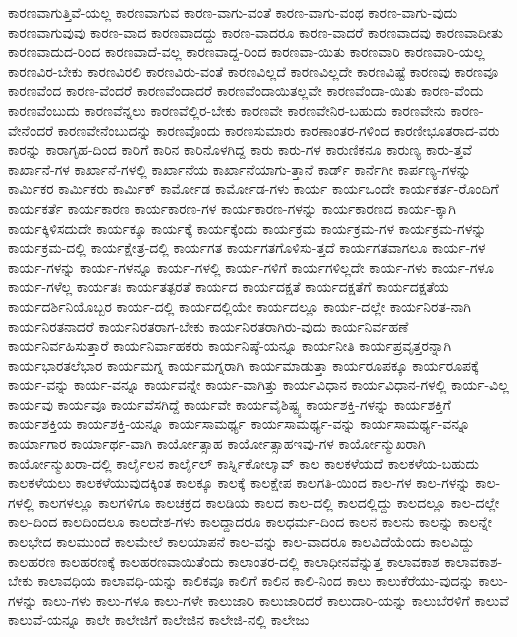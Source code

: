 {ಕಾರಣವಾಗುತ್ತಿವೆ-ಯಲ್ಲ
ಕಾರಣವಾಗುವ
ಕಾರಣ-ವಾಗು-ವಂತೆ
ಕಾರಣ-ವಾಗು-ವಂಥ
ಕಾರಣ-ವಾಗು-ವುದು
ಕಾರಣವಾಗುವುವು
ಕಾರಣ-ವಾದ
ಕಾರಣವಾದದ್ದು
ಕಾರಣ-ವಾದರೂ
ಕಾರಣ-ವಾದರೆ
ಕಾರಣವಾದವು
ಕಾರಣವಾದೀತು
ಕಾರಣವಾದುದ-ರಿಂದ
ಕಾರಣವಾದೆ-ವಲ್ಲ
ಕಾರಣವಾದ್ದ-ರಿಂದ
ಕಾರಣವಾ-ಯಿತು
ಕಾರಣವಾರಿ
ಕಾರಣವಾರಿ-ಯಲ್ಲ
ಕಾರಣವಿರ-ಬೇಕು
ಕಾರಣವಿರಲಿ
ಕಾರಣವಿರು-ವಂತೆ
ಕಾರಣವಿಲ್ಲದೆ
ಕಾರಣವಿಲ್ಲದೇ
ಕಾರಣವಿಷ್ಟೆ
ಕಾರಣವು
ಕಾರಣವೂ
ಕಾರಣವೆಂದ
ಕಾರಣ-ವೆಂದರೆ
ಕಾರಣವೆಂದಾದರೆ
ಕಾರಣವೆಂದಾಯಿತಲ್ಲವೇ
ಕಾರಣವೆಂದಾ-ಯಿತು
ಕಾರಣ-ವೆಂದು
ಕಾರಣವೆಂಬುದು
ಕಾರಣವೆನ್ನಲು
ಕಾರಣವೆಲ್ಲಿರ-ಬೇಕು
ಕಾರಣವೇ
ಕಾರಣವೇನಿರ-ಬಹುದು
ಕಾರಣವೇನು
ಕಾರಣ-ವೇನೆಂದರೆ
ಕಾರಣವೇನೆಂಬುದನ್ನು
ಕಾರಣವೊಂದು
ಕಾರಣಸುಮಾರು
ಕಾರಣಾಂತರ-ಗಳಿಂದ
ಕಾರಣೀಭೂತರಾದ-ವರು
ಕಾರನ್ನು
ಕಾರಾಗೃಹ-ದಿಂದ
ಕಾರಿಗೆ
ಕಾರಿನ
ಕಾರಿನೊಳಗಿದ್ದ
ಕಾರು
ಕಾರು-ಗಳ
ಕಾರುಣಿಕನೂ
ಕಾರುಣ್ಯ
ಕಾರು-ತ್ತವೆ
ಕಾರ್ಖಾನೆ-ಗಳ
ಕಾರ್ಖಾನೆ-ಗಳಲ್ಲಿ
ಕಾರ್ಖಾನೆಯ
ಕಾರ್ಖಾನೆಯಾಗು-ತ್ತಾನೆ
ಕಾರ್ಡ್
ಕಾರ್ನೆಗೀ
ಕಾರ್ಪಣ್ಯ-ಗಳನ್ನು
ಕಾರ್ಮಿಕರ
ಕಾರ್ಮಿಕರು
ಕಾರ್ಮಿಕ್
ಕಾರ್ಮೋಡ
ಕಾರ್ಮೋಡ-ಗಳು
ಕಾರ್ಯ
ಕಾರ್ಯಒಂದೇ
ಕಾರ್ಯಕರ್ತ-ರೊಂದಿಗೆ
ಕಾರ್ಯಕರ್ತೆ
ಕಾರ್ಯಕಾರಣ
ಕಾರ್ಯಕಾರಣ-ಗಳ
ಕಾರ್ಯಕಾರಣ-ಗಳನ್ನು
ಕಾರ್ಯಕಾರಣದ
ಕಾರ್ಯ-ಕ್ಕಾಗಿ
ಕಾರ್ಯಕ್ಕಿಳಿಸದುದೇ
ಕಾರ್ಯಕ್ಕೂ
ಕಾರ್ಯಕ್ಕೆ
ಕಾರ್ಯಕ್ಕೆಂದು
ಕಾರ್ಯಕ್ರಮ
ಕಾರ್ಯಕ್ರಮ-ಗಳ
ಕಾರ್ಯಕ್ರಮ-ಗಳನ್ನು
ಕಾರ್ಯಕ್ರಮ-ದಲ್ಲಿ
ಕಾರ್ಯಕ್ಷೇತ್ರ-ದಲ್ಲಿ
ಕಾರ್ಯಗತ
ಕಾರ್ಯಗತಗೊಳಿಸು-ತ್ತದೆ
ಕಾರ್ಯಗತವಾಗಲೂ
ಕಾರ್ಯ-ಗಳ
ಕಾರ್ಯ-ಗಳನ್ನು
ಕಾರ್ಯ-ಗಳನ್ನೂ
ಕಾರ್ಯ-ಗಳಲ್ಲಿ
ಕಾರ್ಯ-ಗಳಿಗೆ
ಕಾರ್ಯಗಳಿಲ್ಲದೇ
ಕಾರ್ಯ-ಗಳು
ಕಾರ್ಯ-ಗಳೂ
ಕಾರ್ಯ-ಗಳೆಲ್ಲ
ಕಾರ್ಯತಃ
ಕಾರ್ಯತತ್ಪರತೆ
ಕಾರ್ಯದ
ಕಾರ್ಯದಕ್ಷತೆ
ಕಾರ್ಯದಕ್ಷತೆಗೆ
ಕಾರ್ಯದಕ್ಷತೆಯ
ಕಾರ್ಯದರ್ಶಿನಿಯೊಬ್ಬರ
ಕಾರ್ಯ-ದಲ್ಲಿ
ಕಾರ್ಯದಲ್ಲಿಯೇ
ಕಾರ್ಯದಲ್ಲೂ
ಕಾರ್ಯ-ದಲ್ಲೇ
ಕಾರ್ಯನಿರತ-ನಾಗಿ
ಕಾರ್ಯನಿರತನಾದರೆ
ಕಾರ್ಯನಿರತರಾಗ-ಬೇಕು
ಕಾರ್ಯನಿರತರಾಗಿರು-ವುದು
ಕಾರ್ಯನಿರ್ವಹಣೆ
ಕಾರ್ಯನಿರ್ವಹಿಸುತ್ತಾರೆ
ಕಾರ್ಯನಿರ್ವಾಹಕರು
ಕಾರ್ಯನಿಷ್ಠೆ-ಯನ್ನೂ
ಕಾರ್ಯನೀತಿ
ಕಾರ್ಯಪ್ರವೃತ್ತರನ್ನಾಗಿ
ಕಾರ್ಯಭಾರತಲೆಭಾರ
ಕಾರ್ಯಮಗ್ನ
ಕಾರ್ಯಮಗ್ನರಾಗಿ
ಕಾರ್ಯಮಾಡುತ್ತಾ
ಕಾರ್ಯರೂಪಕ್ಕೂ
ಕಾರ್ಯರೂಪಕ್ಕೆ
ಕಾರ್ಯ-ವನ್ನು
ಕಾರ್ಯ-ವನ್ನೂ
ಕಾರ್ಯವನ್ನೇ
ಕಾರ್ಯ-ವಾಗಿತ್ತು
ಕಾರ್ಯವಿಧಾನ
ಕಾರ್ಯವಿಧಾನ-ಗಳಲ್ಲಿ
ಕಾರ್ಯ-ವಿಲ್ಲ
ಕಾರ್ಯವು
ಕಾರ್ಯವೂ
ಕಾರ್ಯವೆಸಗಿದ್ದೆ
ಕಾರ್ಯವೇ
ಕಾರ್ಯವೈಶಿಷ್ಟ್ಯ
ಕಾರ್ಯಶಕ್ತಿ-ಗಳನ್ನು
ಕಾರ್ಯಶಕ್ತಿಗೆ
ಕಾರ್ಯಶಕ್ತಿಯ
ಕಾರ್ಯಶಕ್ತಿ-ಯನ್ನೂ
ಕಾರ್ಯಸಾಮರ್ಥ್ಯ
ಕಾರ್ಯಸಾಮರ್ಥ್ಯ-ವನ್ನು
ಕಾರ್ಯಸಾಮರ್ಥ್ಯ-ವನ್ನೂ
ಕಾರ್ಯಾಗಾರ
ಕಾರ್ಯಾರ್ಥ-ವಾಗಿ
ಕಾರ್ಯೋತ್ಸಾಹ
ಕಾರ್ಯೋತ್ಸಾಹಇವು-ಗಳ
ಕಾರ್ಯೋನ್ಮುಖರಾಗಿ
ಕಾರ್ಯೋನ್ಮುಖರಾ-ದಲ್ಲಿ
ಕಾರ್ಲೈಲನ
ಕಾರ್ಲೈಲ್
ಕಾರ್ಸ್ನಿಕೋಲಾೖವ್
ಕಾಲ
ಕಾಲಕಳೆಯದೆ
ಕಾಲಕಳೆಯ-ಬಹುದು
ಕಾಲಕಳೆಯಲು
ಕಾಲಕಳೆಯುವುದಕ್ಕಿಂತ
ಕಾಲಕ್ಕೂ
ಕಾಲಕ್ಕೆ
ಕಾಲಕ್ಷೇಪ
ಕಾಲಗತಿ-ಯಿಂದ
ಕಾಲ-ಗಳ
ಕಾಲ-ಗಳನ್ನು
ಕಾಲ-ಗಳಲ್ಲಿ
ಕಾಲಗಳಲ್ಲೂ
ಕಾಲಗಳಿಗೂ
ಕಾಲಚಕ್ರದ
ಕಾಲಡಿಯ
ಕಾಲದ
ಕಾಲ-ದಲ್ಲಿ
ಕಾಲದಲ್ಲಿದ್ದು
ಕಾಲದಲ್ಲೂ
ಕಾಲ-ದಲ್ಲೇ
ಕಾಲ-ದಿಂದ
ಕಾಲದಿಂದಲೂ
ಕಾಲದೇಶ-ಗಳು
ಕಾಲದ್ದಾದರೂ
ಕಾಲಧರ್ಮ-ದಿಂದ
ಕಾಲನ
ಕಾಲನು
ಕಾಲನ್ನು
ಕಾಲನ್ನೇ
ಕಾಲಭೇದ
ಕಾಲಮುಂದೆ
ಕಾಲಮೇಲೆ
ಕಾಲಯಾಪನೆ
ಕಾಲ-ವನ್ನು
ಕಾಲ-ವಾದರೂ
ಕಾಲವಿದೆಯೆಂದು
ಕಾಲವಿದ್ದು
ಕಾಲಹರಣ
ಕಾಲಹರಣಕ್ಕೆ
ಕಾಲಹರಣವಾಯಿತೆಂದು
ಕಾಲಾಂತರ-ದಲ್ಲಿ
ಕಾಲಾಧೀನವೆನ್ನುತ್ತ
ಕಾಲಾವಕಾಶ
ಕಾಲಾವಕಾಶ-ಬೇಕು
ಕಾಲಾವಧಿಯ
ಕಾಲಾವಧಿ-ಯನ್ನು
ಕಾಲಿಕವೂ
ಕಾಲಿಗೆ
ಕಾಲಿನ
ಕಾಲಿ-ನಿಂದ
ಕಾಲು
ಕಾಲುಕೆರೆಯು-ವುದನ್ನು
ಕಾಲು-ಗಳನ್ನು
ಕಾಲು-ಗಳು
ಕಾಲು-ಗಳೂ
ಕಾಲು-ಗಳೇ
ಕಾಲುಜಾರಿ
ಕಾಲುಜಾರಿದರೆ
ಕಾಲುದಾರಿ-ಯನ್ನು
ಕಾಲುಬೆರಳಿಗೆ
ಕಾಲುವೆ
ಕಾಲುವೆ-ಯನ್ನೂ
ಕಾಲೇ
ಕಾಲೇಜಿಗೆ
ಕಾಲೇಜಿನ
ಕಾಲೇಜಿ-ನಲ್ಲಿ
ಕಾಲೇಜು
}
